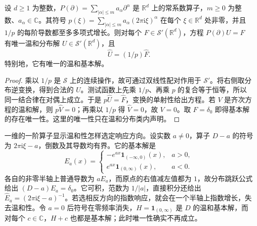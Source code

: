 \begin{proposition}[可逆符号]\label{b2:prop:05-invertible-symbol}
设 \(d\geq1\) 为整数，\(P(\partial)=\sum_{|\alpha|\leq m}a_\alpha\partial^\alpha\) 是 \(\mathbb R^d\) 上的常系数算子，\(m\geq0\) 为整数、\(a_\alpha\in\mathbb C\)。其符号 \(p(\xi)=\sum_{|\alpha|\leq m} a_\alpha(2\pi\mathrm i\xi)^\alpha\) 在每个 \(\xi\in\mathbb R^d\) 处非零，并且 \(1/p\) 的每阶导数都至多多项式增长。则对每个 \(F\in\mathcal S'(\mathbb R^d)\)，方程 \(P(\partial)U=F\) 有唯一温和分布解 \(U\in\mathcal S'(\mathbb R^d)\)，且
\[
 \widehat U=(1/p)\widehat F.
\]
特别地，它有唯一的温和基本解。
\end{proposition}
\begin{proof}
乘以 \(1/p\) 是 \(\mathcal S\) 上的连续操作，故可通过双线性配对作用于 \(\mathcal S'\)。将右侧取分布逆变换，得到合法的 \(U\)。测试函数上先乘 \(1/p\)、再乘 \(p\) 的复合等于恒等，所以同一结合律在对偶上成立。于是 \(p\widehat U=\widehat F\)，变换的单射性给出方程。若 \(V\) 是齐次方程的温和解，则 \(p\widehat V=0\)；再乘以 \(1/p\) 得 \(\widehat V=0\)，故 \(V=0\)。取 \(F=\delta_0\) 即得基本解的存在唯一性。这里的唯一性只在温和分布类内声明。
\end{proof}

一维的一阶算子显示温和性怎样选定响应方向。设实数 \(a\ne0\)，算子 \(D-a\) 的符号为 \(2\pi\mathrm{i}\xi-a\)，倒数及其导数均有界。它的基本解是
\[
 E_a(x)=
 \begin{cases}
 -e^{ax}\mathbf1_{(-\infty,0)}(x),&a>0,\\
 e^{ax}\mathbf1_{(0,\infty)}(x),&a<0.
 \end{cases}
\]
各自的非零半轴上普通导数为 \(aE_a\)，而原点的右值减左值都为 \(1\)，故分布跳跃公式给出 \((D-a)E_a=\delta_0\)。它可积，范数为 \(1/|a|\)，直接积分还给出 \(\widehat E_a=(2\pi\mathrm{i}\xi-a)^{-1}\)。若选相反方向的指数响应，就会在一个半轴上指数增长，失去温和性。令 \(a=0\) 后符号在零频率消失，\(H=\mathbf1_{(0,\infty)}\) 是 \(D\) 的温和基本解，而对每个 \(c\in\mathbb C\)，\(H+c\) 也都是基本解；此时唯一性确实不再成立。


